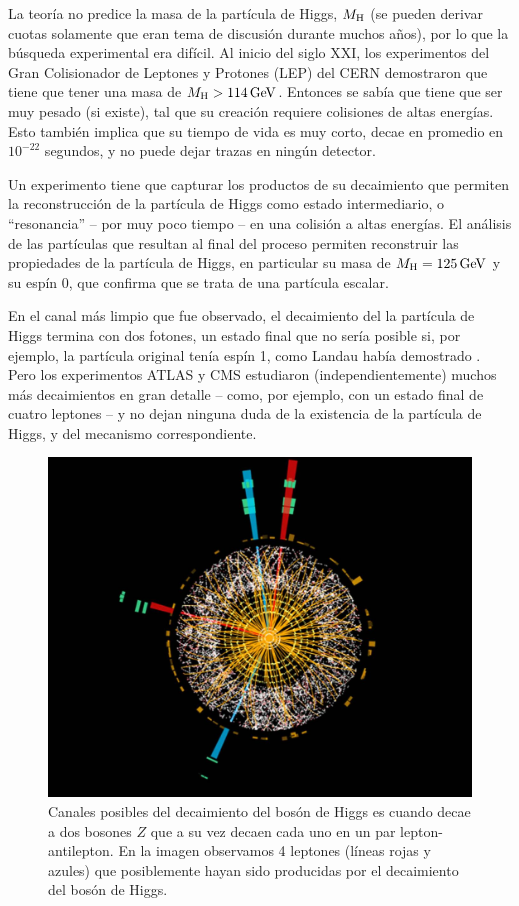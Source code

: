 La teor\'ia no predice la masa de la part\'icula de Higgs, $M_{\rm H}$
(se pueden derivar cuotas solamente que eran tema de discusi\'on durante
muchos a\~nos), por lo que la b\'usqueda experimental era dif\'icil.
Al inicio del siglo XXI, los experimentos del
Gran Colisionador de Leptones y Protones (LEP) del CERN demostraron
que tiene que tener una masa de $M_{\rm H} > 114\, {\rm GeV}$. Entonces se
sab\'ia que tiene que ser muy pesado (si existe), tal que su creaci\'on
requiere colisiones de altas energ\'ias. Esto tambi\'en implica que
su tiempo de vida es muy corto, decae en promedio en $10^{-22}$
segundos, y no puede dejar trazas en ning\'un detector.

Un experimento tiene que capturar los productos de su decaimiento
que permiten la reconstrucci\'on de la part\'icula de Higgs como
estado intermediario, o ``resonancia'' -- por muy poco tiempo --
en una colisi\'on a
altas energ\'ias. El an\'alisis de las part\'iculas que resultan al
final del proceso permiten reconstruir las propiedades de la
part\'icula de Higgs, en particular su masa de $M_{\rm H} = 125\,
{\rm GeV}$ y su esp\'in 0, que confirma que se trata de una part\'icula
escalar.

En el canal m\'as limpio que fue observado, el decaimiento del la
part\'icula de Higgs termina con dos fotones, un estado final que
no ser\'ia posible si, por ejemplo, la part\'icula original
ten\'ia esp\'in 1, como Landau hab\'ia demostrado \cite{Landau}.
Pero los experimentos ATLAS y CMS estudiaron (independientemente)
muchos m\'as decaimientos en gran detalle -- como, por ejemplo,
con un estado final de cuatro leptones -- y no dejan ninguna duda
de la existencia de la part\'icula de Higgs, y del mecanismo
correspondiente.


\begin{figure}
\centering
\includegraphics[scale=0.2]{images/atlas-higgs.jpg}
\caption{Canales posibles del decaimiento del bos\'on de
Higgs es cuando decae a dos bosones $Z$ que a su vez decaen cada
uno en un par lepton-antilepton. 
En la imagen observamos 4 leptones (l\'ineas rojas y azules) que
posiblemente hayan sido producidas por el decaimiento del bos\'on de Higgs.}
\end{figure}


